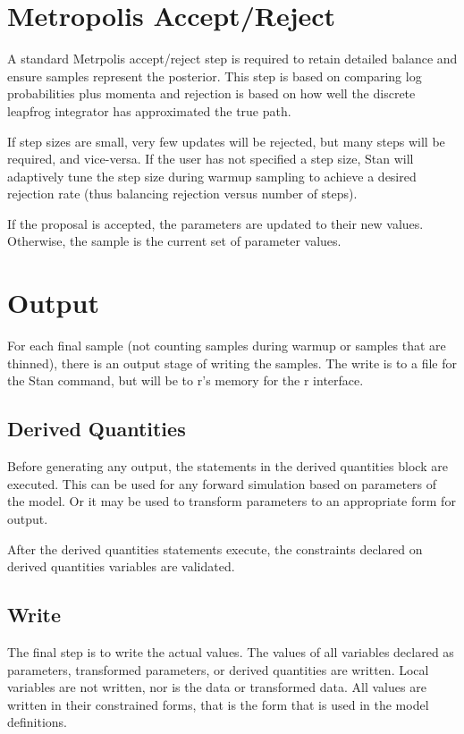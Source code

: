 \documentclass[10pt]{report}
\newcommand{\Stan}{Stan\xspace}
\newcommand{\acronym}[1]{{\sc #1}\xspace}
\newcommand{\R}{\acronym{r}}
\begin{document}
\section{Metropolis Accept/Reject}

A standard Metrpolis accept/reject step is required to retain detailed
balance and ensure samples represent the posterior.  This step is
based on comparing log probabilities plus momenta and rejection is
based on how well the discrete leapfrog integrator has approximated
the true path.  

If step sizes are small, very few updates will be rejected, but many
steps will be required, and vice-versa.  If the user has not specified
a step size, \Stan will adaptively tune the step size during warmup
sampling to achieve a desired rejection rate (thus balancing rejection
versus number of steps).  

If the proposal is accepted, the parameters are updated to their new
values.  Otherwise, the sample is the current set of parameter values.


\section{Output}

For each final sample (not counting samples during warmup or samples
that are thinned), there is an output stage of writing the samples.
The write is to a file for the \Stan command, but will be to \R's memory
for the \R interface.

\subsection{Derived Quantities} 

Before generating any output, the statements in the derived quantities 
block are executed.  This can be used for any forward simulation based
on parameters of the model.  Or it may be used to transform parameters
to an appropriate form for output.  

After the derived quantities statements execute, the constraints
declared on derived quantities variables are validated.  

\subsection{Write}

The final step is to write the actual values.  The values of all
variables declared as parameters, transformed parameters, or derived
quantities are written.  Local variables are not written, nor is the
data or transformed data.  All values are written in their constrained
forms, that is the form that is used in the model definitions.
\end{document}
